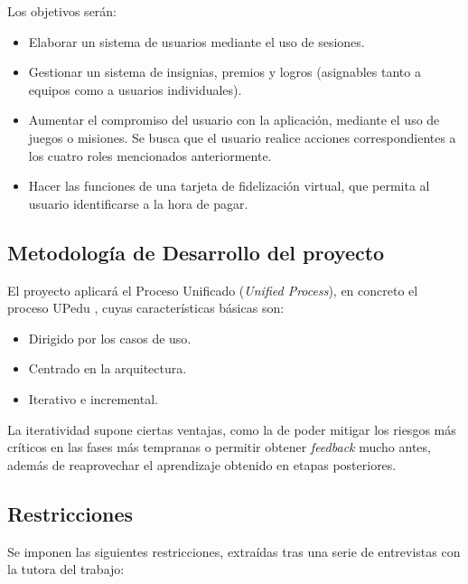 \documentclass[twoside]{report}
\begin{document}
Los objetivos serán:
\begin{itemize}
	\item Elaborar un sistema de usuarios mediante el uso de sesiones.
	\item Gestionar un sistema de insignias, premios y logros (asignables tanto a equipos como a usuarios individuales). 
	\item Aumentar el compromiso del usuario con la aplicación, mediante el uso de juegos o misiones. Se busca que el usuario realice acciones correspondientes a los cuatro roles mencionados anteriormente.
	\item Hacer las funciones de una tarjeta de fidelización virtual, que permita al usuario identificarse a la hora de pagar.
\end{itemize}

\subsection{Metodología de Desarrollo del proyecto}
El proyecto aplicará el Proceso Unificado (\textit{Unified Process}), en concreto el proceso UPedu \cite{upedu}, cuyas características básicas \cite{pgpup} son: 
\begin{itemize}
\item Dirigido por los casos de uso.
\item Centrado en la arquitectura.
\item Iterativo e incremental.
\end{itemize}
La iteratividad supone ciertas ventajas, como la de poder mitigar los riesgos más críticos en las fases más tempranas o permitir obtener \textit{feedback} mucho antes, además de reaprovechar el aprendizaje obtenido en etapas posteriores.

\subsection{Restricciones}
Se imponen las siguientes restricciones, extraídas tras una serie de entrevistas con la tutora del trabajo:
\end{document}
